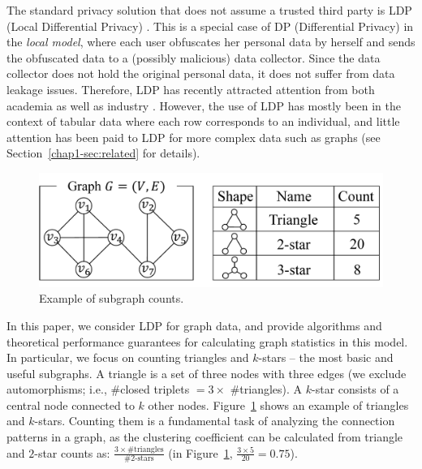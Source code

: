 The standard privacy solution that does not assume a trusted third party is LDP (Local Differential Privacy) \cite{Duchi_FOCS13,Kasiviswanathan_FOCS08}. 
This is a special case of DP 
(Differential Privacy) 
in the \textit{local model}, where each user obfuscates her personal data by herself and sends the obfuscated data to a (possibly malicious) data collector. 
Since the data collector does not hold the original personal data, it does not suffer from data leakage issues. 
Therefore, LDP has recently attracted attention from both academia \cite{Acharya_AISTATS19,Bassily_STOC15,Bassily_NIPS17,Fanti_PoPETs16,Kairouz_ICML16,Kairouz_JMLR16,Murakami_USENIX19,Qin_CCS16,Wang_USENIX17,Ye_ISIT17} as well as industry \cite{Erlingsson_CCS14,Ding_NIPS17,Thakurta_USPatent17}. 
However, the use of LDP has mostly been in the context of tabular data where each row corresponds to an individual, and little attention has been paid to LDP for more complex data such as graphs (see 
Section~\ref{chap1-sec:related} for details). 

\begin{figure}
\centering
\includegraphics[width=0.9\linewidth]{fig/subgraph.pdf}

\caption{Example of subgraph counts.}
\label{chap1-fig:subgraph}
\end{figure}

In this paper, we consider LDP for graph data, and 
provide algorithms and theoretical performance guarantees
for calculating graph statistics in this model. 
In particular, we focus on counting triangles and $k$-stars -- the most basic and useful subgraphs. 
A triangle is a set of three nodes with three edges (we exclude automorphisms; i.e., \#closed triplets $= 3 \times$ \#triangles). 
A $k$-star consists of a central node connected to $k$ other nodes. 
Figure~\ref{chap1-fig:subgraph} shows an example of triangles and $k$-stars. 
Counting them is a fundamental task of analyzing the connection patterns in a graph, as 
the clustering coefficient can be calculated from triangle and $2$-star counts as: $\frac{3 \times \text{\#triangles}}{\#2\text{-stars}}$ (in Figure~\ref{chap1-fig:subgraph}, $\frac{3 \times 5}{20} = 0.75$). 

